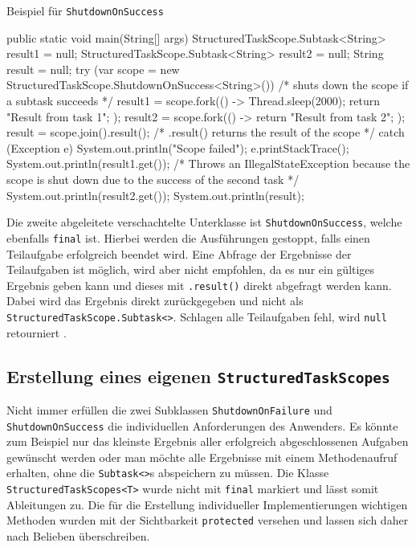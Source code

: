     \begin{program} [H]
        \caption{Beispiel für \texttt{ShutdownOnSuccess}}
        \label{prog:BeispielFürShutdownSuccess}
    \begin{JavaCode}[language=Java, numbers=left]
public static void main(String[] args) {
    StructuredTaskScope.Subtask<String> result1 = null;
    StructuredTaskScope.Subtask<String> result2 = null;
    String result = null;
    try (var scope = new StructuredTaskScope.ShutdownOnSuccess<String>()) {                 
                                            /* shuts down the scope if a subtask 
                                               succeeds */
        result1 = scope.fork(() -> {
            Thread.sleep(2000);
            return "Result from task 1";
        });
        result2 = scope.fork(() -> {
            return "Result from task 2";
        });
        result = scope.join().result();     /* .result() returns the result of the 
                                               scope */
    } catch (Exception e) {
        System.out.println("Scope failed");
        e.printStackTrace();
    }
    System.out.println(result1.get());      /* Throws an IllegalStateException
                                               because the scope is shut down due to
                                               the success of the second task */
    System.out.println(result2.get());
    System.out.println(result);
}\end{JavaCode}
    \end{program}
    Die zweite abgeleitete verschachtelte Unterklasse ist \texttt{ShutdownOnSuccess}, welche ebenfalls \texttt{final} ist. Hierbei werden die Ausführungen gestoppt, falls
    einen Teilaufgabe erfolgreich beendet wird. Eine Abfrage der Ergebnisse der Teilaufgaben ist möglich, wird aber nicht empfohlen, da es nur ein gültiges
    Ergebnis geben kann
    und dieses mit \texttt{.result()} direkt abgefragt werden kann. Dabei wird das Ergebnis direkt zurückgegeben und nicht als \texttt{StructuredTaskScope.Subtask<>}.
    Schlagen alle Teilaufgaben fehl, wird \texttt{null} retourniert \cite{ShutdownOnSuccess}.

\subsection{Erstellung eines eigenen \texttt{StructuredTaskScopes}}
\label{subsec:ErstellungEinesEigenenSts?}

    Nicht immer erfüllen die zwei Subklassen \texttt{ShutdownOnFailure} und \texttt{ShutdownOnSuccess} die individuellen Anforderungen des Anwenders.
    Es könnte zum Beispiel nur das kleinste Ergebnis aller erfolgreich abgeschlossenen Aufgaben gewünscht werden oder man möchte alle Ergebnisse mit
    einem Methodenaufruf erhalten, ohne die \texttt{Subtask<>}s abspeichern zu müssen.
    Die Klasse \texttt{StructuredTaskScopes<T>} wurde nicht mit \texttt{final} markiert und lässt somit Ableitungen zu. Die für die Erstellung individueller Implementierungen wichtigen
    Methoden wurden mit der Sichtbarkeit \texttt{protected} versehen und lassen sich daher nach Belieben überschreiben.

